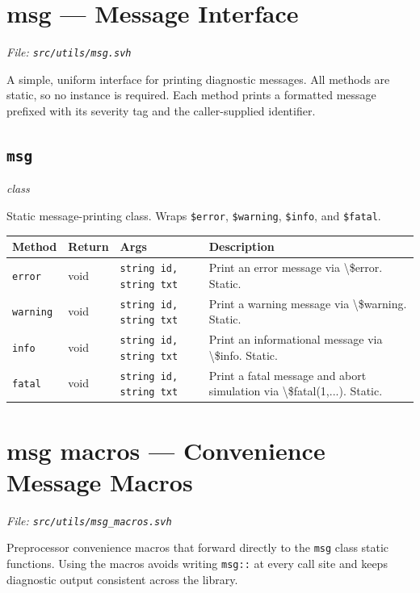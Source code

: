 \documentclass[11pt,letterpaper]{report}
\begin{document}
\section{msg --- Message Interface}
\noindent\small\textit{File: \texttt{src/utils/msg.svh}}\par

A simple, uniform interface for printing diagnostic messages. All methods are static, so no instance is required. Each method prints a formatted message prefixed with its severity tag and the caller-supplied identifier.

\subsection*{\texttt{msg}}
\noindent\small\textit{class}\par

Static message-printing class. Wraps \texttt{\$error}, \texttt{\$warning}, \texttt{\$info}, and \texttt{\$fatal}.

\begin{xltabular}{\linewidth}{>{\small}p{1.35in} >{\small}p{1.25in} >{\small}p{0.95in} >{\small}X}
\toprule
\textbf{Method} & \textbf{Return} & \textbf{Args} & \textbf{Description} \\
\midrule
\endhead
\bottomrule
\endfoot
\texttt{error} & void & \texttt{string id, string txt} & Print an error message via \textbackslash{}\$error. Static. \\
\texttt{warning} & void & \texttt{string id, string txt} & Print a warning message via \textbackslash{}\$warning. Static. \\
\texttt{info} & void & \texttt{string id, string txt} & Print an informational message via \textbackslash{}\$info. Static. \\
\texttt{fatal} & void & \texttt{string id, string txt} & Print a fatal message and abort simulation via \textbackslash{}\$fatal(1,...). Static. \\
\end{xltabular}

\section{msg macros --- Convenience Message Macros}
\noindent\small\textit{File: \texttt{src/utils/msg\_macros.svh}}\par

Preprocessor convenience macros that forward directly to the \texttt{msg} class static functions. Using the macros avoids writing \texttt{msg::} at every call site and keeps diagnostic output consistent across the library.
\end{document}
